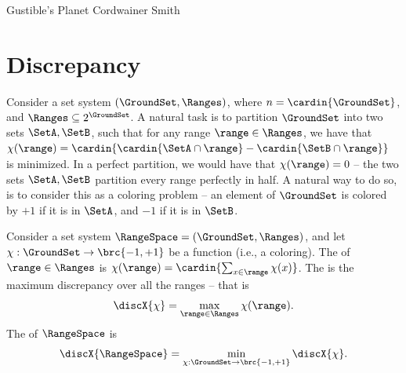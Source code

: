 \makeatletter
{}
\makeatother
\ifx\bookMode\undefined%
\fi
{}

\ChapterPrefix{}
\ChapterGen{}



%
{Gustible's Planet}%
{Cordwainer Smith}



\section{Discrepancy}

Consider a set system $(\GroundSet,\Ranges)$, where
$n =\cardin{\GroundSet}$, and $\Ranges \subseteq 2^\GroundSet$. A
natural task is to partition $\GroundSet$ into two sets
$\SetA, \SetB$, such that for any range $\range \in \Ranges$, we have
that
\begin{math}
    \chi(\range) = \cardin{\bigl. \cardin{\SetA \cap \range} -
       \cardin{\SetB \cap \range}}
\end{math}
is minimized. In a perfect partition, we would have that
$\chi(\range) = 0$ -- the two sets $\SetA,\SetB$ partition every range
perfectly in half. A natural way to do so, is to consider this as a
coloring problem -- an element of $\GroundSet$ is colored by $+1$ if
it is  in $\SetA$, and $-1$ if it is in $\SetB$.


\begin{defn} 
    Consider a set system $\RangeSpace = (\GroundSet,\Ranges)$, and let
    $\chi: \GroundSet \rightarrow \brc{-1,+1}$ be a function (i.e., a
    coloring).  The  of $\range \in \Ranges$ is
    $\chi(\range) = \cardin{\sum_{x \in \range} \chi(x)}$.  The
     is the maximum discrepancy over all
    the ranges -- that is
    \begin{equation*}
        \discX{\chi} = \max_{\range \in \Ranges} \chi(\range).
    \end{equation*}
    The  of $\RangeSpace$ is
    \begin{equation*}
        \discX{\RangeSpace}%
        =%
        \min_{\chi:\GroundSet \rightarrow \brc{-1,+1}} \discX{\chi}.
    \end{equation*}    
\end{defn}

